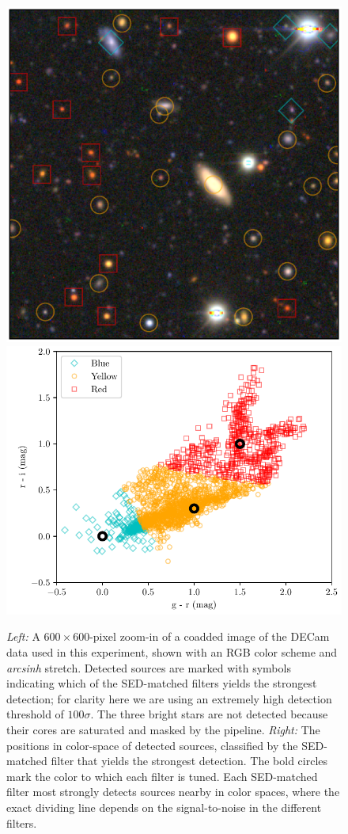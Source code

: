 \documentclass[letterpaper,preprint]{aastex62}
\begin{document}
\begin{figure}
  \begin{center}
    \includegraphics[height=0.4\textwidth]{image-sources}
    \includegraphics[height=0.4\textwidth]{best-color}
    \caption{\emph{Left:} A $600 \times 600$-pixel zoom-in of a
      coadded image of the DECam data used in this experiment, shown
      with an RGB color scheme and \emph{arcsinh} stretch.  Detected
      sources are marked with symbols indicating which of the
      SED-matched filters yields the strongest detection; for clarity
      here we are using an extremely high detection threshold of $100
      \sigma$.  The three bright stars are not detected because their
      cores are saturated and masked by the pipeline.  \emph{Right:}
      The positions in color-space of detected sources, classified by
      the SED-matched filter that yields the strongest detection.  The
      bold circles mark the color to which each filter is tuned.  Each
      SED-matched filter most strongly detects sources nearby in color
      spaces, where the exact dividing line depends on the
      signal-to-noise in the different filters.
      \label{fig:expt}}
  \end{center}
\end{figure}
\end{document}
